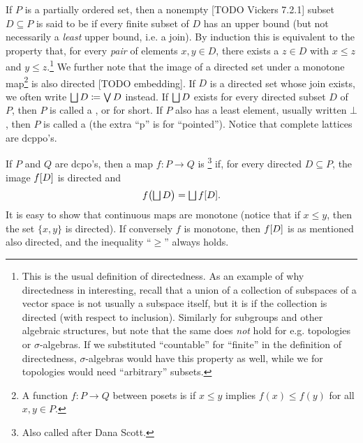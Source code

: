\documentclass[a4paper, 11pt, article, danish, oneside]{memoir}
\DeclarePairedDelimiter{\auxdelimparen}{(}{)}
\DeclarePairedDelimiter{\auxdelimbracket}{[}{]}
\DeclareMathOperator*{\smallbigvee}{\textstyle\bigvee}
\DeclareMathOperator*{\bigjoin}{\mathchoice
    {\smallbigvee}%
    {\bigvee}%
    {\bigvee}%
    {\bigvee}%
}
\DeclareMathOperator*{\smallbigsqcup}{\textstyle\bigsqcup}
\DeclareMathOperator*{\bigdjoin}{\mathchoice
    {\smallbigsqcup}%
    {\bigsqcup}%
    {\bigsqcup}%
    {\bigsqcup}%
}
\newcommand{\defeq}{\coloneqq}
\newcommand{\image}[2][]{\auxdelimbracket[#1]{#2}}
\begin{document}
If $P$ is a partially ordered set, then a nonempty [TODO Vickers 7.2.1] subset $D \subseteq P$ is said to be  if every finite subset of $D$ has an upper bound (but not necessarily a \emph{least} upper bound, i.e. a join). By induction this is equivalent to the property that, for every \emph{pair} of elements $x,y \in D$, there exists a $z \in D$ with $x \leq z$ and $y \leq z$.\footnote{This is the usual definition of directedness. As an example of why directedness in interesting, recall that a union of a collection of subspaces of a vector space is not usually a subspace itself, but it is if the collection is directed (with respect to inclusion). Similarly for subgroups and other algebraic structures, but note that the same does \emph{not} hold for e.g. topologies or $\sigma$-algebras. If we substituted \enquote{countable} for \enquote{finite} in the definition of directedness, $\sigma$-algebras would have this property as well, while we for topologies would need \enquote{arbitrary} subsets.} We further note that the image of a directed set under a monotone map\footnote{A function $f \colon P \to Q$ between posets is  if $x \leq y$ implies $f(x) \leq f(y)$ for all $x,y \in P$.} is also directed [TODO embedding]. If $D$ is a directed set whose join exists, we often write $\bigdjoin D \defeq \bigjoin D$ instead. If $\bigdjoin D$ exists for every directed subset $D$ of $P$, then $P$ is called a , or  for short. If $P$ also has a least element, usually written $\bot$, then $P$ is called a  (the extra \enquote{p} is for \enquote{pointed}). Notice that complete lattices are dcppo's.

If $P$ and $Q$ are dcpo's, then a map $f \colon P \to Q$ is \footnote{Also called  after Dana Scott.} if, for every directed $D \subseteq P$, the image $f\image{D}$ is directed and
%
\begin{equation*}
    f \bigl( \bigdjoin D \bigr)
        = \bigdjoin f\image{D}.
\end{equation*}
%
It is easy to show that continuous maps are monotone (notice that if $x \leq y$, then the set $\{x,y\}$ is directed). If conversely $f$ is monotone, then $f\image{D}$ is as mentioned also directed, and the inequality \enquote{$\geq$} always holds.

\newcommand{\graph}[2][]{\calG\auxdelimparen[#1]{#2}}
\end{document}

